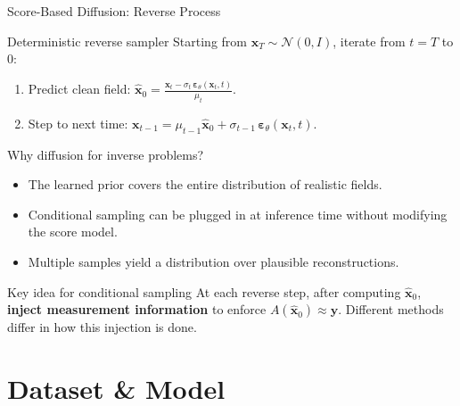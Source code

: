 \documentclass[9pt]{beamer}
\begin{document}

\begin{frame}{Score-Based Diffusion: Reverse Process}
\begin{block}{Deterministic reverse sampler}
Starting from $\mathbf{x}_T \sim \mathcal{N}(0, I)$, iterate from $t = T$ to $0$:
\begin{enumerate}
  \item Predict clean field: $\displaystyle\hat{\mathbf{x}}_0 = \frac{\mathbf{x}_t - \sigma_t\,\boldsymbol{\varepsilon}_\theta(\mathbf{x}_t, t)}{\mu_t}$.
  \item Step to next time: $\mathbf{x}_{t-1} = \mu_{t-1}\hat{\mathbf{x}}_0 + \sigma_{t-1}\,\boldsymbol{\varepsilon}_\theta(\mathbf{x}_t, t)$.
\end{enumerate}
\end{block}
\begin{block}{Why diffusion for inverse problems?}
\begin{itemize}
  \item The learned prior covers the entire distribution of realistic fields.
  \item Conditional sampling can be plugged in at inference time
        without modifying the score model.
  \item Multiple samples yield a distribution over plausible reconstructions.
\end{itemize}
\end{block}
\begin{block}{Key idea for conditional sampling}
At each reverse step, after computing $\hat{\mathbf{x}}_0$,
\textbf{inject measurement information} to enforce $A(\hat{\mathbf{x}}_0) \approx \mathbf{y}$.
Different methods differ in how this injection is done.
\end{block}
\end{frame}

\section{Dataset \& Model}
\end{document}
